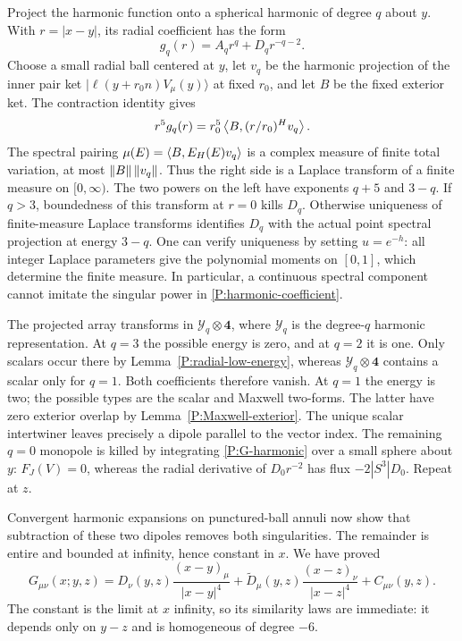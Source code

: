 Project the harmonic function onto a spherical harmonic of degree
$q$ about $y$.  With $r=|x-y|$, its radial coefficient has the form
\begin{equation}
 g_q(r)=A_qr^q+D_qr^{-q-2}.
 \label{P:harmonic-coefficient}
\end{equation}
Choose a small radial ball centered at $y$, let $v_q$ be the harmonic
projection of the inner pair ket
$|\ell(y+r_0n)V_\mu(y)\rangle$ at fixed $r_0$, and let $B$ be the
fixed exterior ket.  The contraction identity gives
\begin{equation}
 r^5g_q(r)=r_0^5\left\langle B,(r/r_0)^Hv_q\right\rangle.
 \label{P:harmonic-spectral}
\end{equation}
The spectral pairing
$\mu(E)=\left\langle B,E_H(E)v_q\right\rangle$ is a complex measure of finite total
variation, at most $\left\lVert B\right\rVert\left\lVert v_q\right\rVert$.  Thus the right side is a
Laplace transform of a finite measure on $[0,\infty)$.
The two powers on the left have exponents $q+5$ and $3-q$.
If $q>3$, boundedness of this transform at $r=0$ kills $D_q$.
Otherwise uniqueness of finite-measure Laplace transforms identifies
$D_q$ with the actual point spectral projection at energy $3-q$.
One can verify uniqueness by setting $u=e^{-h}$: all integer
Laplace parameters give the polynomial moments on $[0,1]$, which
determine the finite measure.  In particular, a continuous spectral
component cannot imitate the singular power in
\eqref{P:harmonic-coefficient}.

The projected array transforms in $\mathcal Y_q\otimes\mathbf4$,
where $\mathcal Y_q$ is the degree-$q$ harmonic representation.
At $q=3$ the possible energy is zero, and at $q=2$ it is one.  Only
scalars occur there by Lemma~\ref{P:radial-low-energy}, whereas
$\mathcal Y_q\otimes\mathbf4$ contains a scalar only for $q=1$.
Both coefficients therefore vanish.  At $q=1$ the energy is two;
the possible types are the scalar and Maxwell two-forms.  The latter
have zero exterior overlap by Lemma~\ref{P:Maxwell-exterior}.  The
unique scalar intertwiner leaves precisely a dipole parallel to the
vector index.  The remaining $q=0$ monopole is killed by integrating
\eqref{P:G-harmonic} over a small sphere about $y$:
$F_J(V)=0$, whereas the radial derivative of $D_0r^{-2}$ has flux
$-2|S^3|D_0$.  Repeat at $z$.

Convergent harmonic expansions on punctured-ball annuli now show
that subtraction of these two dipoles removes both singularities.
The remainder is entire and bounded at infinity, hence constant in
$x$.  We have proved
\begin{equation}
 G_{\mu\nu}(x;y,z)=
 D_\nu(y,z)\frac{(x-y)_\mu}{|x-y|^4}
 +\widetilde D_\mu(y,z)\frac{(x-z)_\nu}{|x-z|^4}
 +C_{\mu\nu}(y,z).
 \label{P:G-decomposition}
\end{equation}
The constant is the limit at $x$ infinity, so its similarity laws are
immediate: it depends only on $y-z$ and is homogeneous of degree $-6$.

